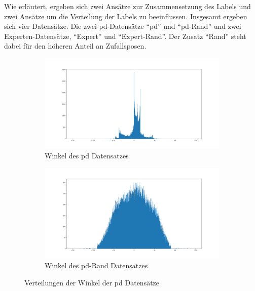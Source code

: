Wie erläutert, ergeben sich zwei Ansätze zur Zusammensetzung des Labels und zwei Ansätze um die Verteilung der Labels zu beeinflussen. Insgesamt ergeben sich vier Datensätze. Die zwei \acs{pd}-Datensätze ``\acs{pd}'' und ``\acs{pd}-Rand'' und zwei Experten-Datensätze, ``Expert'' und ``Expert-Rand''. Der Zusatz ``Rand'' steht dabei für den höheren Anteil an Zufallsposen.\\

\begin{figure}[H]
	\centering
	\begin{subfigure}{0.5\textwidth}
		\centering
		\includegraphics[width=\linewidth]{kapitel4/images/plots/pd-angles.png}
		\caption{Winkel des \acs{pd} Datensatzes}
		\label{pd-drive-angles}
	\end{subfigure}%
	\begin{subfigure}{0.5\textwidth}
		\centering
		\includegraphics[width=\linewidth]{kapitel4/images/plots/pd-rand-angles.png}
		\caption{Winkel des \acs{pd}-Rand Datensatzes}
		\label{pd-rand-angles}
	\end{subfigure}
	\caption{Verteilungen der Winkel der \acs{pd} Datensätze}
	\label{pd-angles}
\end{figure}


